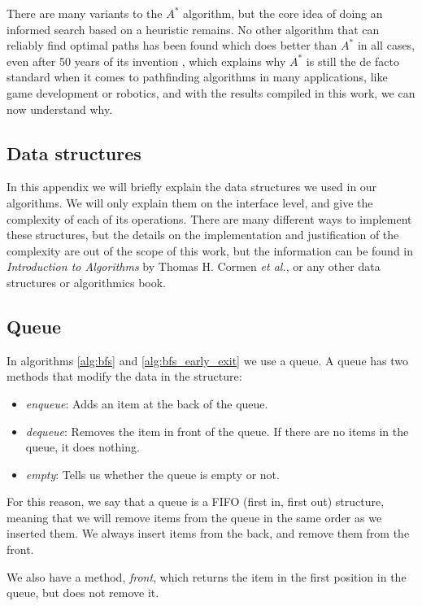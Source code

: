 \documentclass[a4paper,10pt]{report}
\begin{document}
There are many variants to the $A^*$ algorithm, but the core idea of doing an informed search based on a heuristic remains. No other algorithm that can reliably find optimal paths has been found which does better than $A^*$ in all cases, even after 50 years of its invention \cite{hart}, which explains why $A^*$ is still the de facto standard when it comes to pathfinding algorithms in many applications, like game development or robotics, and with the results compiled in this work, we can now understand why.

\begin{appendices}

\chapter{Data structures}

In this appendix we will briefly explain the data structures we used in our algorithms. We will only explain them on the interface level, and give the complexity of each of its operations. There are many different ways to implement these structures, but the details on the implementation and justification of the complexity are out of the scope of this work, but the information can be found in \emph{Introduction to Algorithms} by Thomas H. Cormen \textit{et al.}, or any other data structures or algorithmics book.

\section{Queue}
\label{annex:queue}
In algorithms \ref{alg:bfs} and \ref{alg:bfs_early_exit} we use a queue. A queue has two methods that modify the data in the structure:
\begin{itemize}
\item \emph{enqueue}: Adds an item at the back of the queue.
\item \emph{dequeue}: Removes the item in front of the queue. If there are no items in the queue, it does nothing.
\item \emph{empty}: Tells us whether the queue is empty or not.
\end{itemize}
For this reason, we say that a queue is a FIFO (first in, first out) structure, meaning that we will remove items from the queue in the same order as we inserted them. We always insert items from the back, and remove them from the front.

We also have a method, \emph{front}, which returns the item in the first position in the queue, but does not remove it.


\end{appendices}
\end{document}
